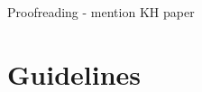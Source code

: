
\begin{frame}
\frametitle{}

\end{frame}


\begin{frame}
\frametitle{}

\end{frame}


\begin{frame}
\frametitle{}

\end{frame}


\begin{frame}
\frametitle{}

\end{frame}


\begin{frame}
\frametitle{}

\end{frame}


\begin{frame}
\frametitle{}

\end{frame}




Proofreading - mention KH paper





\section*{Guidelines}








\subsection*{}

